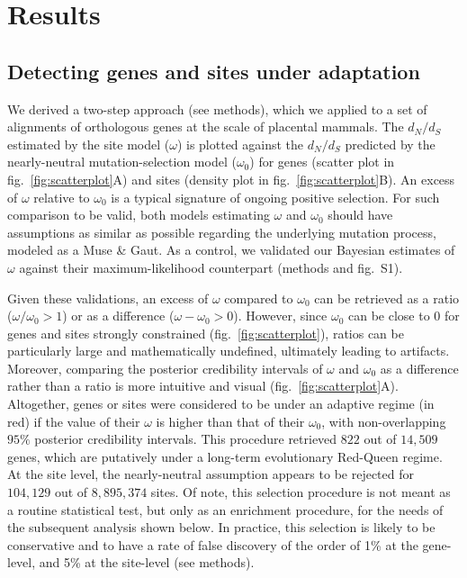 \documentclass[9pt,twocolumn,twoside,lineno]{pnas-new}
\newcommand{\dn}{d_N}
\newcommand{\ds}{d_S}
\newcommand{\dnds}{\dn / \ds}
\begin{document}
\section*{Results}\label{sec:results}
\subsection*{Detecting genes and sites under adaptation}
We derived a two-step approach (see methods), which we applied to a set of alignments of orthologous genes at the scale of placental mammals.
The $\dnds$ estimated by the site model ($\omega$) is plotted against the $\dnds$ predicted by the nearly-neutral mutation-selection model ($\omega_{0}$) for genes (scatter plot in fig.~\ref{fig:scatterplot}A) and sites (density plot in fig.~\ref{fig:scatterplot}B).
An excess of $\omega$ relative to $\omega_{0}$ is a typical signature of ongoing positive selection\cite{bloom_identification_2017, rodrigue_detecting_2017}.
For such comparison to be valid, both models estimating $\omega$ and $\omega_{0}$ should have assumptions as similar as possible regarding the underlying mutation process, modeled as a Muse \& Gaut\cite{muse_likelihood_1994, spielman_relationship_2015}.
As a control, we validated our Bayesian estimates of $\omega$ against their maximum-likelihood counterpart (methods and fig.~S1).

Given these validations, an excess of $\omega$ compared to $\omega_{0}$ can be retrieved as a ratio ($\omega / \omega_{0} > 1$) or as a difference ($\omega - \omega_{0}>0$).
However, since $\omega_{0}$ can be close to $0$ for genes and sites strongly constrained (fig.~\ref{fig:scatterplot}), ratios can be particularly large and mathematically undefined, ultimately leading to artifacts.
Moreover, comparing the posterior credibility intervals of $\omega$ and $\omega_{0}$ as a difference rather than a ratio is more intuitive and visual (fig.~\ref{fig:scatterplot}A).
Altogether, genes or sites were considered to be under an adaptive regime (in red) if the value of their $\omega$ is higher than that of their $\omega_{0}$, with non-overlapping $95\%$ posterior credibility intervals.
This procedure retrieved $822$ out of $14,509$ genes, which are putatively under a long-term evolutionary Red-Queen regime.
At the site level, the nearly-neutral assumption appears to be rejected for $104,129$ out of $8,895,374$ sites.
Of note, this selection procedure is not meant as a routine statistical test, but only as an enrichment procedure, for the needs of the subsequent analysis shown below.
In practice, this selection is likely to be conservative and to have a rate of false discovery of the order of 1\% at the gene-level, and 5\% at the site-level (see methods).
\end{document}

